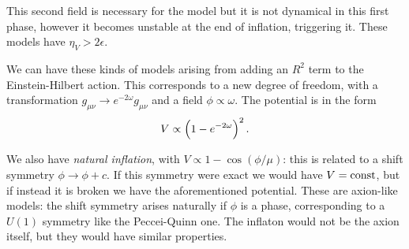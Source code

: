 \documentclass[main.tex]{subfiles}
\begin{document}
This second field is necessary for the model but it is not dynamical in this first phase, however it becomes unstable at the end of inflation, triggering it. 
These models have \(\eta _V > 2 \epsilon \). 

We can have these kinds of models arising from adding an \(R^2\) term to the Einstein-Hilbert action. 
This corresponds to a new degree of freedom, with a transformation \(g_{\mu \nu } \to e^{-2 \omega } g_{\mu \nu }\) and a field \(\phi  \propto \omega \). 
The potential is in the form 
%
\begin{align}
V \propto \qty(1 - e^{-2 \omega })^2
\,.
\end{align}

We also have \emph{natural inflation}, with \(V \propto 1 - \cos(\phi / \mu )\): this is related to a shift symmetry \(\phi \to \phi + c\). 
If this symmetry were exact we would have \(V = \text{const}\), but if instead it is broken we have the aforementioned potential. 
These are axion-like models: the shift symmetry arises naturally if \(\phi \) is a phase, corresponding to a \(U(1)\) symmetry like the Peccei-Quinn one.
The inflaton would not be the axion itself, but they would have similar properties. 
\end{document}
